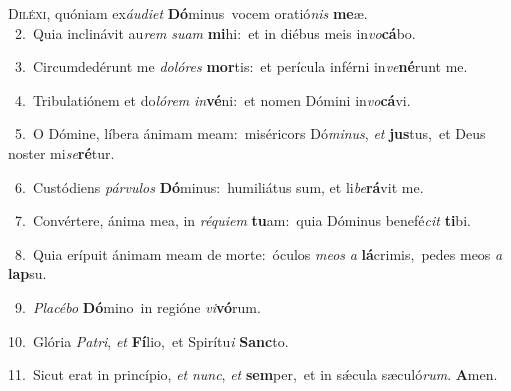 \lettrine{\initial\textcolor{\initialcolor}{D}}{iléxi,} quóniam ex\-\textit{áu}\-\textit{di}\textit{et} \textbf{Dó}\-minus~\star vocem oratió\textit{nis} \textbf{me}\-æ.\\
{\numbfont\textcolor{\numbcolor}{~2.}}~Quia inclinávit au\textit{rem} \textit{su}\-\textit{am} \textbf{mi}\-hi:~\star et in diébus meis in\-\textit{vo}\-\textbf{cá}bo.\par
{\numbfont\textcolor{\numbcolor}{~3.}}~Circumdedérunt me \textit{do}\-\textit{ló}\textit{res} \textbf{mor}\-tis:~\star et perícula inférni in\-\textit{ve}\-\textbf{né}runt me.\par
{\numbfont\textcolor{\numbcolor}{~4.}}~Tribulatiónem et do\-\textit{ló}\-\textit{rem} \textit{in}\-\textbf{vé}ni:~\star et nomen Dómini in\-\textit{vo}\-\textbf{cá}vi.\par
{\numbfont\textcolor{\numbcolor}{~5.}}~O Dómine, líbera ánimam meam:~\dagger miséricors Dó\-\textit{mi}\-\textit{nus}, \textit{et} \textbf{jus}\-tus,~\star et Deus noster mi\-\textit{se}\-\textbf{ré}tur.\par
{\numbfont\textcolor{\numbcolor}{~6.}}~Custódiens \textit{pár}\-\textit{vu}\textit{los} \textbf{Dó}\-minus:~\star humiliátus sum, et li\-\textit{be}\-\textbf{rá}vit me.\par
{\numbfont\textcolor{\numbcolor}{~7.}}~Convértere, ánima mea, in \textit{ré}\-\textit{qui}\textit{em} \textbf{tu}\-am:~\star quia Dóminus benefé\textit{cit} \textbf{ti}\-bi.\par
{\numbfont\textcolor{\numbcolor}{~8.}}~Quia erípuit ánimam meam de morte:~\dagger óculos \textit{me}\-\textit{os} \textit{a} \textbf{lá}\-crimis,~\star pedes meos \textit{a} \textbf{lap}\-su.\par
{\numbfont\textcolor{\numbcolor}{~9.}}~\-\textit{Pla}\-\textit{cé}\textit{bo} \textbf{Dó}\-mino~\star in regióne \textit{vi}\-\textbf{vó}rum.\par
{\numbfont\textcolor{\numbcolor}{10.}}~Glória \textit{Pa}\-\textit{tri}, \textit{et} \textbf{Fí}\-lio,~\star et Spirítu\textit{i} \textbf{Sanc}\-to.\par
{\numbfont\textcolor{\numbcolor}{11.}}~Sicut erat in princípio, \textit{et} \textit{nunc}\-, \textit{et} \textbf{sem}\-per,~\star et in sǽcula sæculó\-\textit{rum}\-. \textbf{A}\-men.\par
